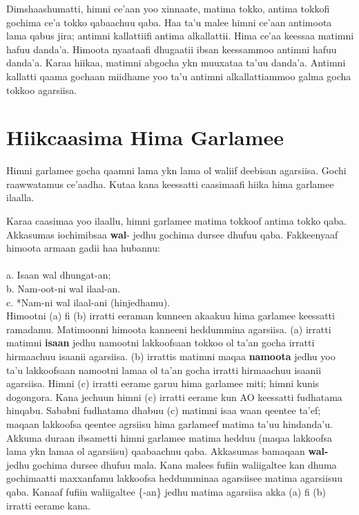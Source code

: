 \documentclass[11pt,b5paper]{book}
\begin{document}
Dimshaashumatti, himni ce’aan yoo xinnaate, matima tokko, antima tokkofi gochima ce’a tokko qabaachuu qaba. Haa ta’u malee himni ce’aan antimoota lama qabus jira; antimni kallattiifi antima alkallattii. Hima ce’aa keessaa matimni hafuu danda’a. Himoota nyaataafi dhugaatii ibsan keessammoo antimni hafuu danda’a. Karaa hiikaa, matimni abgocha ykn muuxataa ta’uu danda’a. Antimni kallatti qaama gochaan miidhame yoo ta’u antimni alkallattiammoo galma gocha tokkoo agarsiisa.

\section{Hiikcaasima Hima Garlamee}

Himni garlamee gocha qaamni lama ykn lama ol waliif deebisan agarsiisa. Gochi raawwatamus ce’aadha. Kutaa kana keessatti caasimaafi hiika hima garlamee ilaalla. 

Karaa caasimaa yoo ilaallu, himni garlamee matima tokkoof antima tokko qaba. Akkasumas iochimibsaa \textbf{wal}- jedhu gochima dursee dhufuu qaba. Fakkeenyaaf himoota armaan gadii haa hubannu: \\
\\
a. Isaan wal dhungat-an; \\
b. Nam-oot-ni wal ilaal-an.\\
c. *Nam-ni wal ilaal-ani (hinjedhamu). \\

Himootni (a) fi (b) irratti eeraman kunneen akaakuu hima garlamee keessatti ramadamu. Matimoonni himoota kanneeni heddummina agarsiisa. (a) irratti matimni \textbf{isaan} jedhu namootni lakkoofsaan tokkoo ol ta’an gocha irratti hirmaachuu isaanii agarsiisa. (b) irrattis matimni maqaa \textbf{namoota} jedhu yoo ta’u lakkoofsaan namootni lamaa ol ta’an gocha irratti hirmaachuu isaanii agarsiisa. Himni (c) irratti eerame garuu hima garlamee miti; himni kunis dogongora. Kana jechuun himni
(c) irratti eerame kun AO keessatti fudhatama hinqabu. Sababni fudhatama dhabuu (c) matimni isaa waan qeentee ta’ef; maqaan lakkoofsa qeentee agrsiisu hima garlameef matima ta’uu hindanda’u. Akkuma duraan ibsametti himni garlamee matima hedduu (maqaa lakkoofsa lama ykn lamaa ol agarsiisu) qaabaachuu qaba. Akkasumas bamaqaan\textbf{ wal-} jedhu gochima dursee dhufuu mala. Kana malees fufiin waliigaltee
kan dhuma gochimaatti maxxanfamu lakkoofsa heddumminaa agarsiisee matima agarsiisuu qaba. Kanaaf fufiin waliigaltee \{-an\} jedhu matima agarsiisa akka (a) fi (b) irratti eerame kana.
\end{document}
